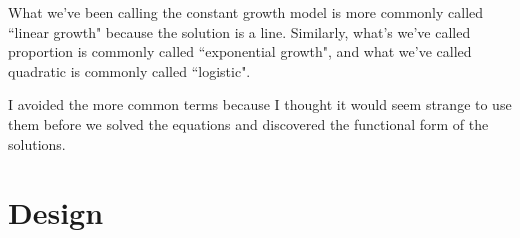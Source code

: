 \documentclass[12pt]{book}
\theoremstyle{exercise}
\begin{document}
What we've been calling the constant growth model is more commonly called ``linear growth" because the solution is a line.  Similarly, what's we've called proportion is commonly called ``exponential growth", and what we've called quadratic is commonly called ``logistic".

I avoided the more common terms because I thought it would seem strange to use them before we solved the equations and discovered the functional form of the solutions.




\chapter{Design}

\backmatter
\printindex
\end{document}
